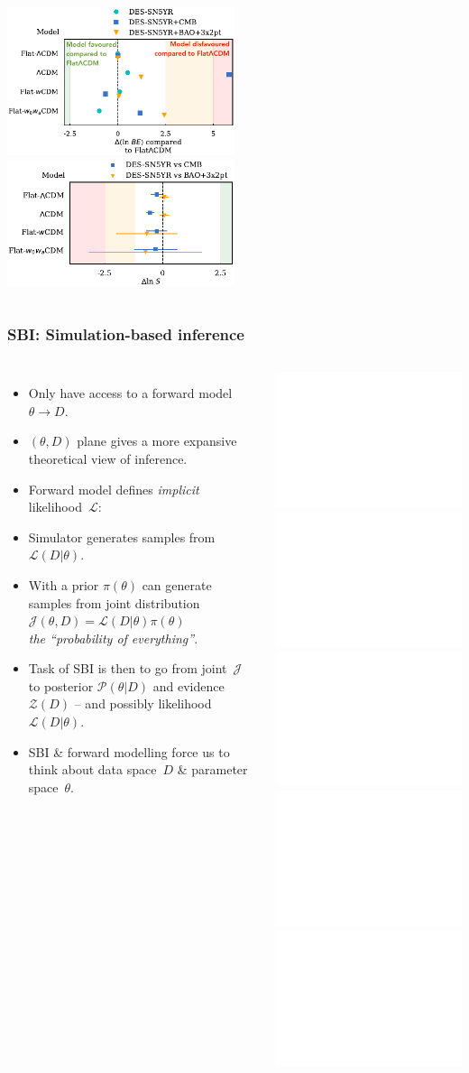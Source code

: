 \documentclass[aspectratio=169,handout]{beamer}
\begin{document}
\begin{frame}
\begin{columns}
        \includegraphics[width=0.5\textwidth]{figures/des_model_comparison.pdf}%
        \includegraphics[width=0.5\textwidth]{figures/des_suspiciousness.pdf}
    \end{columns}
\end{frame}

\begin{frame}
    \frametitle{SBI: Simulation-based inference}
    \begin{columns}
        \begin{itemize}
            \item Only have access to a forward model $\theta \rightarrow D$.
            \item $(\theta,D)$ plane gives a more expansive theoretical view of inference.
            \item Forward model defines \emph{implicit} likelihood~$\mathcal{L}$:
            \item Simulator generates samples from $\mathcal{L}(D|\theta)$.
            \item With a prior $\pi(\theta)$ can generate samples from joint distribution~$\mathcal{J}(\theta,D)=\mathcal{L}(D|\theta)\pi(\theta)$\\\hfill \emph{the ``probability of everything''}.
            \item Task of SBI is then to go from joint~$\mathcal{J}$ to posterior $\mathcal{P}(\theta|D)$ and evidence $\mathcal{Z}(D)$ -- and possibly likelihood $\mathcal{L}(D|\theta)$.
            \item SBI \& forward modelling force us to think about data space~$D$ \& parameter space~$\theta$.
        \end{itemize}
        \includegraphics<1>[page=1, width=\textwidth]{figures/sbi_parameter_estimation.pdf}%
        \includegraphics<2>[page=2, width=\textwidth]{figures/sbi_parameter_estimation.pdf}%
        \includegraphics<3>[page=3, width=\textwidth]{figures/sbi_parameter_estimation.pdf}%
        \includegraphics<4>[page=4, width=\textwidth]{figures/sbi_parameter_estimation.pdf}%
        \includegraphics<5>[page=5, width=\textwidth]{figures/sbi_parameter_estimation.pdf}%
    \end{columns}
\end{frame}
\end{document}
